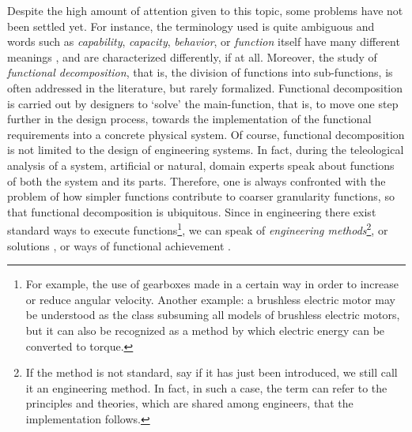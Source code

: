 \documentclass[sw]{iosart2x}
\newcommand{\firstTimeKeyWord}[1]{\textit{#1}}
\newcommand{\quotes}[1]{`#1'}
\newcommand{\myComment}[1]{}
\begin{document}
Despite the high amount of attention given to this topic, some problems have not been settled yet. 
For instance, the terminology used is quite ambiguous and words such as \firstTimeKeyWord{capability}, \firstTimeKeyWord{capacity}, \firstTimeKeyWord{behavior}, or \firstTimeKeyWord{function} itself have many different meanings \cite{borgoCapabilitiesCapacitiesFunctionalities2021, erdenReviewFunctionModeling2008}, and are characterized differently, if at all\myComment{, depending on the author}.
Moreover, the study of \firstTimeKeyWord{functional decomposition}, that is, the division of functions into sub-functions, is often addressed in the literature, but rarely formalized.
Functional decomposition is carried out by designers to \quotes{solve} the main-function, that is, to move one step further in the design process, towards the implementation of the functional requirements into a concrete physical system.
Of course, functional decomposition is not limited to the design of engineering systems. 
In fact, during the teleological analysis of a system, artificial or natural, domain experts speak about functions of both the system and its parts.
Therefore, one is always confronted with the problem of how simpler functions contribute to coarser granularity functions, so that functional decomposition is ubiquitous. %
Since in engineering there exist standard ways to execute functions\footnote{For example, the use of gearboxes made in a certain way in order to increase or reduce angular velocity. Another example: a brushless electric motor may be understood as the class subsuming all models of brushless electric motors, but it can also be recognized as a method by which electric energy can be converted to torque.}, we can speak of \firstTimeKeyWord{engineering methods}\footnote{If the method is not standard, say if it has just been introduced, we still call it an engineering method. In fact, in such a case, the term can refer to the principles and theories, which are shared among engineers, that the implementation follows.}, or solutions \cite{pahl_engineering_2007}, or ways of functional achievement \cite{kitamuraOntologicalModelDevice2006}. \myComment{, the last two terms taken from \cite{pahl_engineering_2007} and \cite{kitamuraOntologicalModelDevice2006} respectively}   
\end{document}
